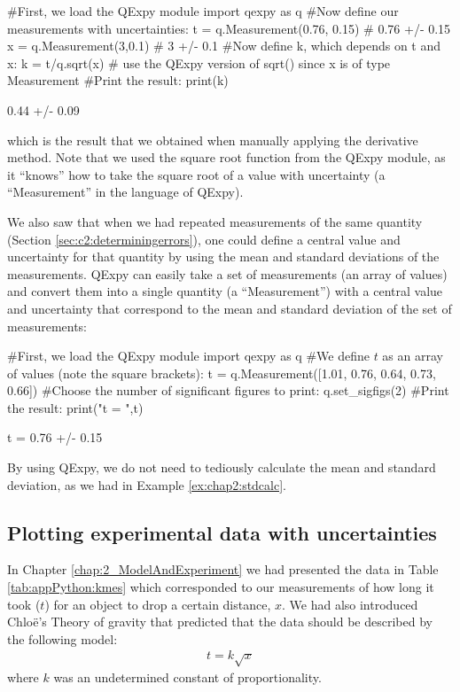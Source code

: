 \begin{python}[caption=QExpy to propagate uncertainties] 
#First, we load the QExpy module
import qexpy as q
#Now define our measurements with uncertainties:
t = q.Measurement(0.76, 0.15) # 0.76 +/- 0.15
x = q.Measurement(3,0.1) # 3 +/- 0.1
#Now define k, which depends on t and x:
k = t/q.sqrt(x) # use the QExpy version of sqrt() since x is of type Measurement
#Print the result:
print(k)
\end{python}
\begin{poutput}
0.44 +/- 0.09
\end{poutput}
which is the result that we obtained when manually applying the derivative method. Note that we used the square root function from the QExpy module, as it ``knows'' how to take the square root of a value with uncertainty (a ``Measurement'' in the language of QExpy). 

We also saw that when we had repeated measurements of the same quantity (Section \ref{sec:c2:determiningerrors}), one could define a central value and uncertainty for that quantity by using the mean and standard deviations of the measurements. QExpy can easily take a set of measurements (an array of values) and convert them into a single quantity (a ``Measurement'') with a central value and uncertainty that correspond to the mean and standard deviation of the set of measurements:

\begin{python}[caption=QExpy to calculate mean and standard deviation] 
#First, we load the QExpy module
import qexpy as q
#We define $t$ as an array of values (note the square brackets):
t = q.Measurement([1.01,  0.76,  0.64,  0.73,  0.66])
#Choose the number of significant figures to print:
q.set_sigfigs(2)
#Print the result:
print("t = ",t)
\end{python}
\begin{poutput}
t = 0.76 +/- 0.15
\end{poutput}
By using QExpy, we do not need to tediously calculate the mean and standard deviation, as we had in Example \ref{ex:chap2:stdcalc}.


\subsection{Plotting experimental data with uncertainties}
In Chapter \ref{chap:2_ModelAndExperiment} we had presented the data in Table \ref{tab:appPython:kmes} which corresponded to our measurements of how long it took ($t$) for an object to drop a certain distance, $x$. We had also introduced  Chlo\"e's Theory of gravity that predicted that the data should be described by the following model:
\begin{align*}
t = k \sqrt{x}
\end{align*}
where $k$ was an undetermined constant of proportionality.


